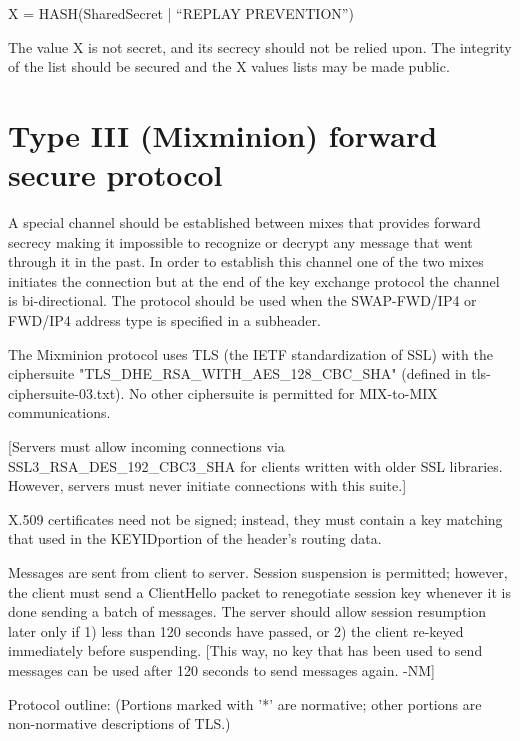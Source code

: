 X = HASH(SharedSecret | ``REPLAY PREVENTION'')

The value X is not secret, and its secrecy should not be relied upon.
The integrity of the list should be secured and the X values lists may
be made public.

\section{Type III (Mixminion) forward secure protocol}

A special channel should be established between mixes that provides
forward secrecy making it impossible to recognize or decrypt any
message that went through it in the past. In order to establish this
channel one of the two mixes initiates the connection but at the end
of the key exchange protocol the channel is bi-directional. The
protocol should be used when the SWAP-FWD/IP4 or FWD/IP4 address type
is specified in a subheader.

The Mixminion protocol uses TLS (the IETF standardization of SSL) with
the ciphersuite "TLS_DHE_RSA_WITH_AES_128_CBC_SHA" (defined in
tls-ciphersuite-03.txt).  No other ciphersuite is permitted for
MIX-to-MIX communications.

[Servers must allow incoming connections via SSL3_RSA_DES_192_CBC3_SHA
for clients written with older SSL libraries.  However, servers must
never initiate connections with this suite.]

X.509 certificates need not be signed; instead, they must contain
a key matching that used in the KEYIDportion of the header's routing
data.  

Messages are sent from client to server.  Session suspension is
permitted; however, the client must send a ClientHello packet to
renegotiate session key whenever it is done sending a batch of
messages.  The server should allow session resumption later only if 1)
less than 120 seconds have passed, or 2) the client re-keyed
immediately before suspending.  [This way, no key that has been used
to send messages can be used after 120 seconds to send messages
again. -NM]

Protocol outline: (Portions marked with '*' are normative; other
portions are non-normative descriptions of TLS.)

